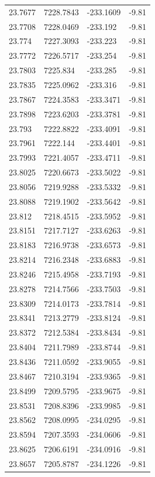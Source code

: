 \begin{table}[H]
\begin{tabular}{llll}
23.7677 & 7228.7843 & -233.1609 & -9.81 \\
23.7708 & 7228.0469 & -233.192 & -9.81 \\
23.774 & 7227.3093 & -233.223 & -9.81 \\
23.7772 & 7226.5717 & -233.254 & -9.81 \\
23.7803 & 7225.834 & -233.285 & -9.81 \\
23.7835 & 7225.0962 & -233.316 & -9.81 \\
23.7867 & 7224.3583 & -233.3471 & -9.81 \\
23.7898 & 7223.6203 & -233.3781 & -9.81 \\
23.793 & 7222.8822 & -233.4091 & -9.81 \\
23.7961 & 7222.144 & -233.4401 & -9.81 \\
23.7993 & 7221.4057 & -233.4711 & -9.81 \\
23.8025 & 7220.6673 & -233.5022 & -9.81 \\
23.8056 & 7219.9288 & -233.5332 & -9.81 \\
23.8088 & 7219.1902 & -233.5642 & -9.81 \\
23.812 & 7218.4515 & -233.5952 & -9.81 \\
23.8151 & 7217.7127 & -233.6263 & -9.81 \\
23.8183 & 7216.9738 & -233.6573 & -9.81 \\
23.8214 & 7216.2348 & -233.6883 & -9.81 \\
23.8246 & 7215.4958 & -233.7193 & -9.81 \\
23.8278 & 7214.7566 & -233.7503 & -9.81 \\
23.8309 & 7214.0173 & -233.7814 & -9.81 \\
23.8341 & 7213.2779 & -233.8124 & -9.81 \\
23.8372 & 7212.5384 & -233.8434 & -9.81 \\
23.8404 & 7211.7989 & -233.8744 & -9.81 \\
23.8436 & 7211.0592 & -233.9055 & -9.81 \\
23.8467 & 7210.3194 & -233.9365 & -9.81 \\
23.8499 & 7209.5795 & -233.9675 & -9.81 \\
23.8531 & 7208.8396 & -233.9985 & -9.81 \\
23.8562 & 7208.0995 & -234.0295 & -9.81 \\
23.8594 & 7207.3593 & -234.0606 & -9.81 \\
23.8625 & 7206.6191 & -234.0916 & -9.81 \\
23.8657 & 7205.8787 & -234.1226 & -9.81 \\

\end{tabular}
\end{table}
